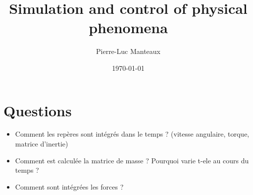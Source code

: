 \documentclass[11pt, oneside, a4paper]{memoir}
\begin{document}
\title{Simulation and control of physical phenomena}
\author{Pierre-Luc Manteaux}
\date{\today}
\maketitle

\frontmatter
\chapter{Questions}
\begin{itemize}
\item Comment les repères sont intégrés dans le temps ? (vitesse angulaire, torque, matrice d'inertie)
\item Comment est calculée la matrice de masse ? Pourquoi varie t-ele au cours du temps ?
\item Comment sont intégrées les forces ?
\end{itemize}


\tableofcontents

\mainmatter
%

%
%
%
%
%


\backmatter
\printbibliography
\listoffigures
\listofalgorithms
\listoftables
\end{document}
